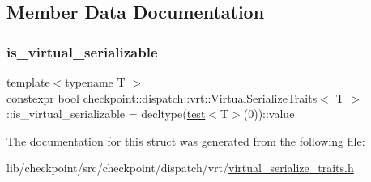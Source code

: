 \subsection{Member Data Documentation}
\mbox{\label{structcheckpoint_1_1dispatch_1_1vrt_1_1_virtual_serialize_traits_a93d9ad95dbb6a0b00982a7f2cc2d54b7}} 
\subsubsection{\texorpdfstring{is\+\_\+virtual\+\_\+serializable}{is\_virtual\_serializable}}
{\footnotesize\ttfamily template$<$typename T $>$ \\
constexpr bool \hyperlink{structcheckpoint_1_1dispatch_1_1vrt_1_1_virtual_serialize_traits}{checkpoint\+::dispatch\+::vrt\+::\+Virtual\+Serialize\+Traits}$<$ T $>$\+::is\+\_\+virtual\+\_\+serializable = decltype(\hyperlink{structcheckpoint_1_1dispatch_1_1vrt_1_1_virtual_serialize_traits_a31d0ba739deb9cac3010c076666f4099}{test}$<$T$>$(0))\+::value\hspace{0.3cm}{\ttfamily [static]}}



The documentation for this struct was generated from the following file\+:\begin{DoxyCompactItemize}
\item 
lib/checkpoint/src/checkpoint/dispatch/vrt/\hyperlink{virtual__serialize__traits_8h}{virtual\+\_\+serialize\+\_\+traits.\+h}\end{DoxyCompactItemize}
